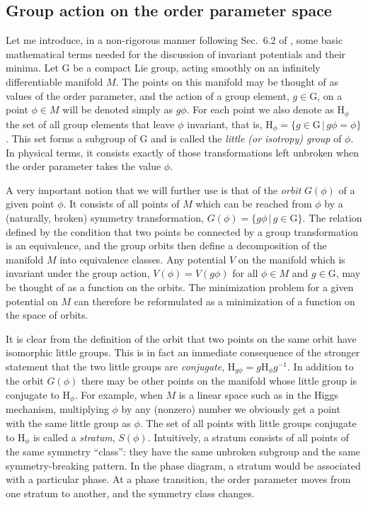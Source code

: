 \documentclass[final,3p,times,12pt,a4paper,sort&compress]{elsarticle}
\newcommand\gr[1]{\mathrm{#1}}              %
\begin{document}
\subsection{Group action on the order parameter space}
\label{subsec:Michel} Let me introduce, in a non-rigorous manner following
Sec.~6.2 of \cite{Vollhardt:1990vw}, some basic mathematical terms needed for
the discussion of invariant potentials and their minima. Let $\gr G$ be a
compact Lie group, acting smoothly on an infinitely differentiable manifold $M$.
The points on this manifold may be thought of as values of the order parameter,
and the action of a group element, $g\in\gr G$, on a point $\phi\in M$ will be
denoted simply as $g\phi$. For each point we also denote as $\gr H_\phi$ the
set of all group elements that leave $\phi$ invariant, that is, $\gr
H_\phi=\{g\in\gr G\,|\,g\phi=\phi\}$. This set forms a subgroup of $\gr G$ and
is called the \emph{little (or isotropy) group} of $\phi$. In physical terms,
it consists exactly of those transformations left unbroken when the order
parameter takes the value $\phi$.

A very important notion that we will further use is that of the \emph{orbit}
$G(\phi)$ of a given point $\phi$. It consists of all points of $M$ which can
be reached from $\phi$ by a (naturally, broken) symmetry transformation,
$G(\phi)=\{g\phi\,|\,g\in\gr G\}$. The relation defined by the condition that
two points be connected by a group transformation is an equivalence, and
the group orbits then define a decomposition of the manifold $M$ into
equivalence classes. Any potential $V$ on the manifold which is invariant under
the group action, $V(\phi)=V(g\phi)$ for all $\phi\in M$ and $g\in\gr G$, may
be thought of as a function on the orbits. The minimization problem for a given
potential on $M$ can therefore be reformulated as a minimization of a function
on the space of orbits.

It is clear from the definition of the orbit that two points on the same orbit
have isomorphic little groups. This is in fact an immediate consequence of the
stronger statement that the two little groups are \emph{conjugate}, $\gr
H_{g\phi}=g\gr H_\phi g^{-1}$. In addition to the orbit $G(\phi)$ there may be
other points on the manifold whose little group is conjugate to $\gr H_\phi$.
For example, when $M$ is a linear space such as in the Higgs mechanism,
multiplying $\phi$ by any (nonzero) number we obviously get a point with the
same little group as $\phi$. The set of all points with little groups conjugate
to $\gr H_\phi$ is called a \emph{stratum}, $S(\phi)$. Intuitively, a stratum
consists of all points of the same symmetry ``class'': they have the same
unbroken subgroup and the same symmetry-breaking pattern. In the phase
diagram, a stratum would be associated with a particular phase. At a phase
transition, the order parameter moves from one stratum to another, and the
symmetry class changes.
\end{document}
